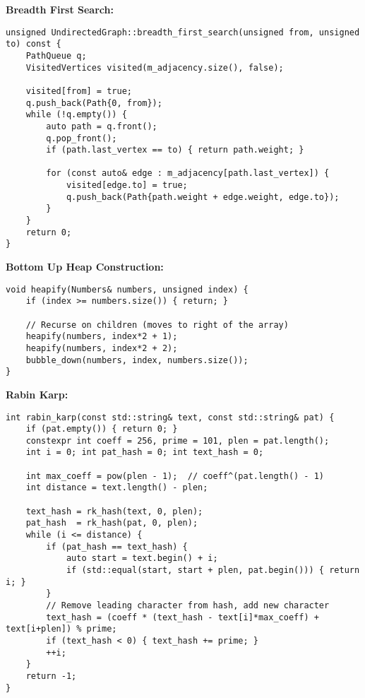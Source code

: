 \documentclass[12pt]{article}
\begin{document}
\vspace{5mm}
\noindent
\textbf{Breadth First Search:}
\begin{lstlisting}[frame=single]
unsigned UndirectedGraph::breadth_first_search(unsigned from, unsigned to) const {
    PathQueue q;
    VisitedVertices visited(m_adjacency.size(), false);

    visited[from] = true;
    q.push_back(Path{0, from});
    while (!q.empty()) {
        auto path = q.front();
        q.pop_front();
        if (path.last_vertex == to) { return path.weight; }

        for (const auto& edge : m_adjacency[path.last_vertex]) {
            visited[edge.to] = true;
            q.push_back(Path{path.weight + edge.weight, edge.to});
        }
    }
    return 0;
}
\end{lstlisting}

\noindent
\textbf{Bottom Up Heap Construction:}
\begin{lstlisting}[frame=single]
void heapify(Numbers& numbers, unsigned index) {
    if (index >= numbers.size()) { return; }

    // Recurse on children (moves to right of the array)
    heapify(numbers, index*2 + 1);
    heapify(numbers, index*2 + 2);
    bubble_down(numbers, index, numbers.size());
}
\end{lstlisting}

\noindent
\textbf{Rabin Karp:}
\begin{lstlisting}[frame=single]
int rabin_karp(const std::string& text, const std::string& pat) {
    if (pat.empty()) { return 0; }
    constexpr int coeff = 256, prime = 101, plen = pat.length();
    int i = 0; int pat_hash = 0; int text_hash = 0;
    
    int max_coeff = pow(plen - 1);  // coeff^(pat.length() - 1)
    int distance = text.length() - plen;

    text_hash = rk_hash(text, 0, plen);
    pat_hash  = rk_hash(pat, 0, plen);
    while (i <= distance) {
        if (pat_hash == text_hash) {
            auto start = text.begin() + i;
            if (std::equal(start, start + plen, pat.begin())) { return i; }
        }
        // Remove leading character from hash, add new character
        text_hash = (coeff * (text_hash - text[i]*max_coeff) + text[i+plen]) % prime;
        if (text_hash < 0) { text_hash += prime; }
        ++i;
    } 
    return -1;
}
\end{lstlisting}
\end{document}

